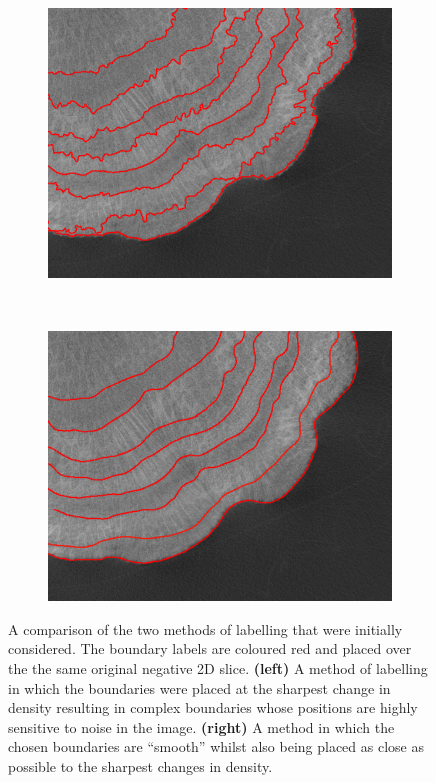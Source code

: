 \begin{figure}[t]
    \centering
    \begin{subfigure}[t]{0.49\textwidth}
        \centering
        \includegraphics[width=1\textwidth, valign=c]{images/rough-label.png}
    \end{subfigure}
    ~
    \begin{subfigure}[t]{0.49\textwidth}
        \centering
        \includegraphics[width=1\textwidth, valign=c]{images/smooth-label.png}
    \end{subfigure}
    \caption{A comparison of the two methods of labelling that were initially considered. The boundary labels are coloured red and placed over the the same original negative 2D slice. \textbf{(left)} A method of labelling in which the boundaries were placed at the sharpest change in density resulting in complex boundaries whose positions are highly sensitive to noise in the image. \textbf{(right)} A method in which the chosen boundaries are ``smooth'' whilst also being placed as close as possible to the sharpest changes in density.}
    \label{fig:labelstyle}
\end{figure}

